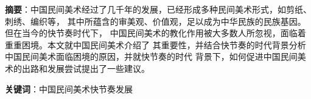 
\noindent\textbf{摘要}：中国民间美术经过了几千年的发展，已经形成多种民间美术形式，如剪纸、刺绣、编织等，
其中所蕴含的审美观、价值观，足以成为中华民族的民族基因。但在当今的快节奏时代下，
中国民间美术的教化作用被大多数人所忽视，面临着重重困境。本文就中国民间美术介绍了
其重要性，并结合快节奏的时代背景分析中国民间美术面临困境的原因，并就快节奏的时代
背景下，如何促进中国民间美术的出路和发展尝试提出了一些建议。


\noindent\textbf{关键词}：中国民间美术\quad 快节奏\quad 发展